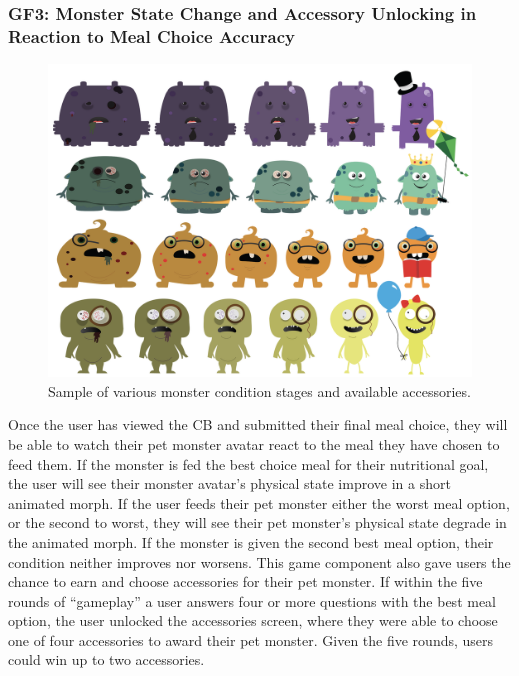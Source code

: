 \subsubsection{GF3: Monster State Change and Accessory Unlocking in Reaction to Meal Choice Accuracy}

\begin{figure}
\includegraphics[width=\linewidth]{samples/images/figure-5.png}
\caption{Sample of various monster condition stages and available accessories.}
\label{fig:monster-stages}
\end{figure}
 
Once the user has viewed the CB and submitted their final meal choice, they will be able to watch their pet monster avatar react to the meal they have chosen to feed them. 
If the monster is fed the best choice meal for their nutritional goal, the user will see their monster avatar's physical state improve in a short animated morph.
If the user feeds their pet monster either the worst meal option, or the second to worst, they will see their pet monster's physical state degrade in the animated morph. 
If the monster is given the second best meal option, their condition neither improves nor worsens. 
This game component also gave users the chance to earn and choose accessories for their pet monster. 
If within the five rounds of ``gameplay'' a user answers four or more questions with the best meal option, the user unlocked the accessories screen, where they were able to choose one of four accessories to award their pet monster. 
Given the five rounds, users could win up to two accessories.







